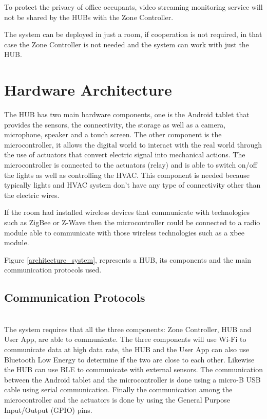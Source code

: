 To protect the privacy of office occupants, video streaming monitoring service will not be shared by the HUBs with the Zone Controller.

The system can be deployed in just a room, if cooperation is not required, in that case the Zone Controller is not needed and the system can work with just the HUB.



\section{Hardware Architecture}\label{architecture3} 

The HUB has two main hardware components, one is the Android tablet that provides the sensors, the connectivity, the storage as well as a camera, microphone, speaker and a touch screen. 
The other component is the microcontroller, it allows the digital world to interact with the real world through the use of actuators that convert electric signal into mechanical actions. The microcontroller is connected to the actuators (relay) and is able to switch on/off the lights as well as controlling the HVAC. This component is needed because typically lights and HVAC system don't have any type of connectivity other than the electric wires. 


If the room had installed wireless devices that communicate with technologies such as ZigBee or Z-Wave then the microcontroller could be connected to a radio module able to communicate with those wireless technologies such as a xbee module.


Figure \ref{architecture_system}, represents a HUB, its components and the main communication protocols used.

 

\subsection{Communication Protocols}\mbox{}\\

The system requires that all the three components: Zone Controller, HUB and User App, are able to communicate. The three components will use Wi-Fi to communicate data at high data rate, the HUB and the User App can also use Bluetooth Low Energy to determine if the two are close to each other. Likewise the HUB can use BLE to communicate with external sensors. The communication between the Android tablet and the microcontroller is done using a micro-B USB cable using serial communication. Finally the communication among the microcontroller and the actuators is done by using the General Purpose Input/Output (GPIO) pins.




